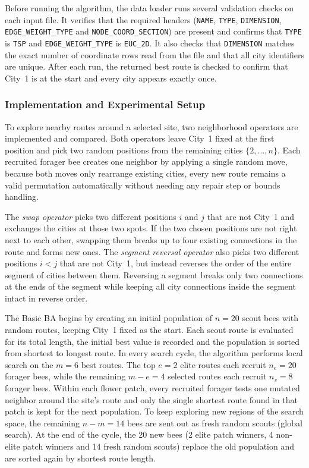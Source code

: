 Before running the algorithm, the data loader runs several validation checks on each input file.
It verifies that the required headers (\texttt{NAME}, \texttt{TYPE}, \texttt{DIMENSION}, \texttt{EDGE\_WEIGHT\_TYPE} and \texttt{NODE\_COORD\_SECTION}) are present and confirms that \texttt{TYPE} is \texttt{TSP} and \texttt{EDGE\_WEIGHT\_TYPE} is \texttt{EUC\_2D}.
It also checks that \texttt{DIMENSION} matches the exact number of coordinate rows read from the file and that all city identifiers are unique.
After each run, the returned best route is checked to confirm that City~1 is at the start and every city appears exactly once.

\subsubsection{Implementation and Experimental Setup}
To explore nearby routes around a selected site, two neighborhood operators are implemented and compared.
Both operators leave City~1 fixed at the first position and pick two random positions from the remaining cities \(\{2, \dots, n\}\).
Each recruited forager bee creates one neighbor by applying a single random move, because both moves only rearrange existing cities, every new route remains a valid permutation automatically without needing any repair step or bounds handling.

The \textit{swap operator} picks two different positions \(i\) and \(j\) that are not City~1 and exchanges the cities at those two spots.
If the two chosen positions are not right next to each other, swapping them breaks up to four existing connections in the route and forms new ones.
The \textit{segment reversal operator} also picks two different positions \(i < j\) that are not City~1, but instead reverses the order of the entire segment of cities between them.
Reversing a segment breaks only two connections at the ends of the segment while keeping all city connections inside the segment intact in reverse order.

The Basic BA begins by creating an initial population of \(n = 20\) scout bees with random routes, keeping City~1 fixed as the start.
Each scout route is evaluated for its total length, the initial best value is recorded and the population is sorted from shortest to longest route.
In every search cycle, the algorithm performs local search on the \(m = 6\) best routes.
The top \(e = 2\) elite routes each recruit \(n_e = 20\) forager bees, while the remaining \(m - e = 4\) selected routes each recruit \(n_s = 8\) forager bees.
Within each flower patch, every recruited forager tests one mutated neighbor around the site's route and only the single shortest route found in that patch is kept for the next population.
To keep exploring new regions of the search space, the remaining \(n - m = 14\) bees are sent out as fresh random scouts (global search).
At the end of the cycle, the 20 new bees (2 elite patch winners, 4 non-elite patch winners and 14 fresh random scouts) replace the old population and are sorted again by shortest route length.


